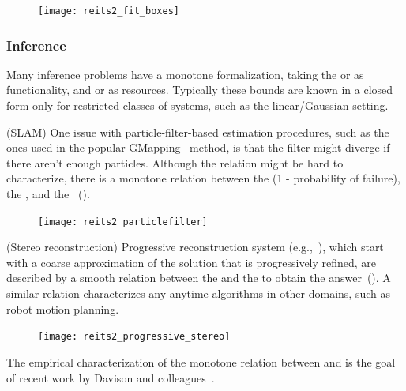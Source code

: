 \begin{figure}[h]
    \centering
\texttt{[image: reits2\_fit\_boxes]}
\caption{\label{fig:packing}}
\end{figure}


\subsubsection{Inference}

Many inference problems have a monotone formalization, taking the
 or  as functionality, and 
or  as resources. Typically these bounds are known in
a closed form only for restricted classes of systems, such as the
linear/Gaussian setting.

\begin{example}
(SLAM) One issue with particle-filter-based estimation procedures,
such as the ones used in the popular GMapping~\cite{grisetti07improved}
method, is that the filter might diverge if there aren't enough particles.
Although the relation might be hard to characterize, there is a monotone
relation between the  (1 - probability of failure),
the , and the ~().
\end{example}

\begin{figure}[h]
    \centering
\texttt{[image: reits2\_particlefilter]}
\caption{\label{fig:gmapping} }
\end{figure}



\begin{example}
(Stereo reconstruction) Progressive reconstruction system (e.g.,~\cite{locher16progressive}),
which start with a coarse approximation of the solution that is progressively
refined, are described by a smooth relation between the 
and the  to obtain the answer~().
A similar relation characterizes any anytime algorithms in other domains,
such as robot motion planning.
\end{example}

\begin{figure}[h]
    \centering
    \texttt{[image: reits2\_progressive\_stereo]}
    \caption{\label{fig:progressive}}
\end{figure}


\begin{example}
The empirical characterization of the monotone relation between  and 
is the goal of recent work by Davison and colleagues~\cite{nardi15introducing,zia16comparative}.
\end{example}


